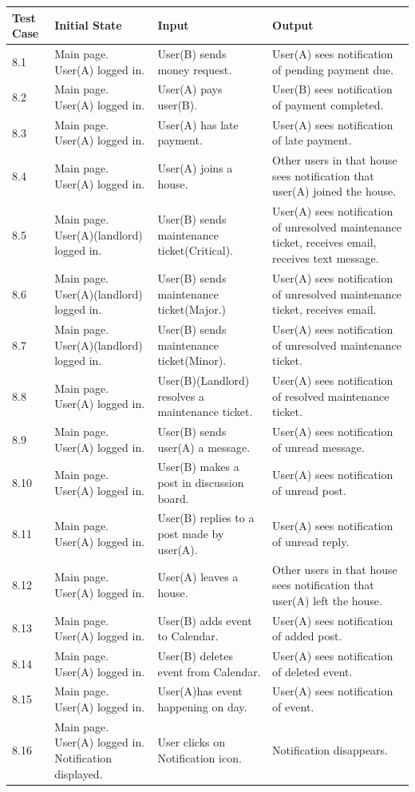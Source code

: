 \documentclass[12pt]{article}
\begin{document}
\begin{longtable}{|p{2cm}|p{3cm}|p{5cm}|p{5cm}|}
\hline
\textbf{Test Case}  & \textbf{Initial State} & \textbf{Input} & \textbf{Output} \\ \hline
8.1 & Main page. User(A) logged in. & User(B) sends money request. & User(A) sees notification of pending payment due.  \\ 
\hline
8.2 & Main page. User(A) logged in. & User(A) pays user(B). & User(B) sees notification of payment completed.  \\ 
\hline
8.3 & Main page. User(A) logged in. & User(A) has late payment. & User(A) sees notification of late payment.  \\ 
\hline
8.4 & Main page. User(A) logged in. & User(A) joins a house.  & Other users in that house sees notification that user(A) joined the house. \\
\hline
8.5 & Main page. User(A)(landlord) logged in. & User(B) sends maintenance ticket(Critical). & User(A) sees notification of unresolved maintenance ticket, receives email, receives text message. \\
\hline
8.6 & Main page. User(A)(landlord) logged in. & User(B) sends maintenance ticket(Major.) & User(A) sees notification of unresolved maintenance ticket, receives email.\\
\hline
8.7 & Main page. User(A)(landlord) logged in. & User(B) sends maintenance ticket(Minor). & User(A) sees notification of unresolved maintenance ticket. \\
\hline
8.8 & Main page. User(A) logged in. & User(B)(Landlord) resolves a maintenance ticket. & User(A) sees notification of resolved maintenance ticket. \\
\hline
8.9 & Main page. User(A) logged in. & User(B) sends user(A) a message. & User(A) sees notification of unread message. \\
\hline
8.10 & Main page. User(A) logged in. & User(B) makes a post in discussion board. & User(A) sees notification of unread post. \\
\hline
8.11 & Main page. User(A) logged in. & User(B) replies to a post made by user(A). & User(A) sees notification of unread reply. \\
\hline
8.12 & Main page. User(A) logged in. & User(A) leaves a house.  & Other users in that house sees notification that user(A) left the house. \\
\hline
8.13 & Main page. User(A) logged in. & User(B) adds event to Calendar. & User(A) sees notification of added post. \\
\hline
8.14 & Main page. User(A) logged in. & User(B) deletes event from Calendar. & User(A) sees notification of deleted event. \\
\hline
8.15 & Main page. User(A) logged in. & User(A)has event happening on day. & User(A) sees notification of event. \\
\hline
8.16 & Main page. User(A) logged in. Notification displayed. & User clicks on Notification icon. & Notification disappears. \\
\hline
\end{longtable}
\end{document}
